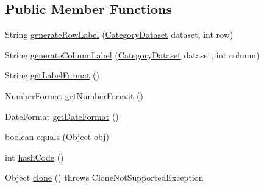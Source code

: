 \subsection*{Public Member Functions}
\begin{DoxyCompactItemize}
\item 
String \mbox{\hyperlink{classorg_1_1jfree_1_1chart_1_1labels_1_1_abstract_category_item_label_generator_a3c0ba4bceb1c69d82ed5baf8ee453624}{generate\+Row\+Label}} (\mbox{\hyperlink{interfaceorg_1_1jfree_1_1data_1_1category_1_1_category_dataset}{Category\+Dataset}} dataset, int row)
\item 
String \mbox{\hyperlink{classorg_1_1jfree_1_1chart_1_1labels_1_1_abstract_category_item_label_generator_a9747731ecb97965eb7bfcb218bfe9f27}{generate\+Column\+Label}} (\mbox{\hyperlink{interfaceorg_1_1jfree_1_1data_1_1category_1_1_category_dataset}{Category\+Dataset}} dataset, int column)
\item 
String \mbox{\hyperlink{classorg_1_1jfree_1_1chart_1_1labels_1_1_abstract_category_item_label_generator_a4f5292f7a93ed8cb2d7eb35386bd88de}{get\+Label\+Format}} ()
\item 
Number\+Format \mbox{\hyperlink{classorg_1_1jfree_1_1chart_1_1labels_1_1_abstract_category_item_label_generator_a49fb722031d810ccb05f160172868459}{get\+Number\+Format}} ()
\item 
Date\+Format \mbox{\hyperlink{classorg_1_1jfree_1_1chart_1_1labels_1_1_abstract_category_item_label_generator_abfe34589fef191fb02edc3b908be18cd}{get\+Date\+Format}} ()
\item 
boolean \mbox{\hyperlink{classorg_1_1jfree_1_1chart_1_1labels_1_1_abstract_category_item_label_generator_a92d79ad602e58995379754649c42353e}{equals}} (Object obj)
\item 
int \mbox{\hyperlink{classorg_1_1jfree_1_1chart_1_1labels_1_1_abstract_category_item_label_generator_aa88f8541867de6d809af00b7eb46941a}{hash\+Code}} ()
\item 
Object \mbox{\hyperlink{classorg_1_1jfree_1_1chart_1_1labels_1_1_abstract_category_item_label_generator_a8289eb2e1eddc09948d3417c1a2c84d9}{clone}} ()  throws Clone\+Not\+Supported\+Exception 
\end{DoxyCompactItemize}
